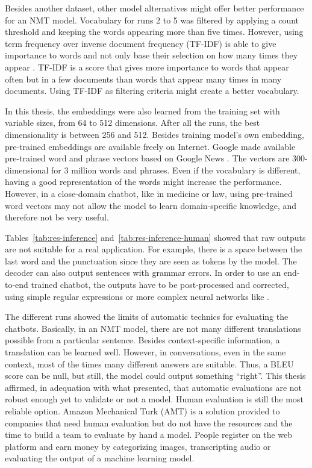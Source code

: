 Besides another dataset, other model alternatives might offer better performance for an NMT model. Vocabulary for runs 2 to 5 was filtered by applying a count threshold and keeping the words appearing more than five times.
However, using term frequency over inverse document frequency (TF-IDF) is able to give importance to words and not only base their selection on how many times they appear \citep{manning2008introduction}. TF-IDF is a score that gives more importance to words that appear often but in a few documents than words that appear many times in many documents.
Using TF-IDF as filtering criteria might create a better vocabulary.

In this thesis, the embeddings were also learned from the training set with variable sizes, from 64 to 512 dimensions. After all the runs, the best dimensionality is between 256 and 512.
Besides training model's own embedding, pre-trained embeddings are available freely on Internet. Google made available pre-trained word and phrase vectors based on Google News \citep{googlearchive-word2vec}. The vectors are 300-dimensional for 3 million words and phrases.
Even if the vocabulary is different, having a good representation of the words might increase the performance. However, in a close-domain chatbot, like in medicine or law, using pre-trained word vectors may not allow the model to learn domain-specific knowledge, and therefore not be very useful.

Tables~\ref{tab:res-inference} and~\ref{tab:res-inference-human} showed that raw outputs are not suitable for a real application. For example, there is a space between the last word and the punctuation since they are seen as tokens by the model.
The decoder can also output sentences with grammar errors. In order to use an end-to-end trained chatbot, the outputs have to be post-processed and corrected, using simple regular expressions or more complex neural networks like \citet{1606.00189}.

The different runs showed the limits of automatic technics for evaluating the chatbots. Basically, in an NMT model, there are not many different translations possible from a particular sentence. Besides context-specific information, a translation can be learned well. However, in conversations, even in the same context, most of the times many different answers are suitable.
Thus, a BLEU score can be null, but still, the model could output something ``right''.
This thesis affirmed, in adequation with what \citet{1603.08023} presented, that automatic evaluations are not robust enough yet to validate or not a model. Human evaluation is still the most reliable option.
Amazon Mechanical Turk (AMT) is a solution provided to companies that need human evaluation but do not have the resources and the time to build a team to evaluate by hand a model. People register on the web platform and earn money by categorizing images, transcripting audio or evaluating the output of a machine learning model.

